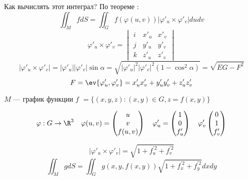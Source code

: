 \begin{remark}
    Как вычислять этот интеграл? По теореме :
    \[\iint_M fdS = \iint_G f(\varphi(u, v)) |\varphi'_u \times \varphi'_v| du dv\]
    \[\varphi'_u \times \varphi'_v = \begin{vmatrix}
            i & x'_u & x'_v \\
            j & y'_u & y'_v \\
            k & z'_u & z'_v
        \end{vmatrix}\]
    \[ |\varphi'_u \times \varphi'_v| = |\varphi'_u| |\varphi'_v| \sin \alpha = \sqrt{ |\varphi'_u|^2 |\varphi'_v|^2 (1 - \cos^2\alpha) } = \sqrt{EG - F^2} \]
    \[F = \ev{\varphi'_u, \varphi'_v} = x'_u x'_v + y'_u y'_v + z'_u z'_v\]
\end{remark}

\begin{example}
    \(M\) --- график функции \(f\) \( = \{(x, y, z) : (x, y) \in G, z = f(x, y)\} \)

    \[\varphi : G \to \R^3 \quad \varphi(u, v) = \begin{pmatrix} u \\ v \\ f(u, v) \end{pmatrix} \quad \varphi'_u = \begin{pmatrix} 1 \\ 0 \\ f'_u \end{pmatrix} \quad \varphi'_v \begin{pmatrix} 0 \\ 1 \\ f'_v \end{pmatrix} \]

    \[|\varphi'_u \times \varphi'_v| = \sqrt{1 + f_u^{\prime 2} + f_v^{\prime 2}}\]
    \[\iint_M g dS = \iint_G g(x, y, f(x, y)) \sqrt{1 + f_x^{\prime 2} + f_y^{\prime 2}} dx dy\]
\end{example}
